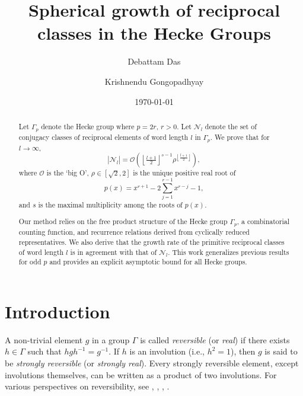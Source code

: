 \documentclass[11pt]{amsart}
\numberwithin{equation}{section}
\theoremstyle{definition}
\numberwithin{equation}{section}
\begin{document}
	\title[Spherical growth of reciprocal classes in the Hecke Groups]{ Spherical growth of reciprocal classes in the Hecke Groups }
	\author{Debattam Das  \and Krishnendu Gongopadhyay}
	\address{Indian Institute of Science Education and Research (IISER) Mohali,
		Knowledge City,  Sector 81, S.A.S. Nagar 140306, Punjab, India}
    	\address{Indian Institute of Science Education and Research (IISER) Mohali,
		Knowledge City,  Sector 81, S.A.S. Nagar 140306, Punjab, India}
	
	
	\begin{abstract}
		Let $\Gamma_p$ denote the Hecke group where $p=2r$, $r>0$. Let $\mathcal{N}_l$ denote the set of conjugacy classes of reciprocal elements of word length $l$ in $\Gamma_p$. We prove that for $l \to \infty$, 
		$$|\mathcal{N}_l| = \mathcal{O}\left(\left\lfloor \tfrac{l+1}{2} \right\rfloor^{s-1} \rho^{\left\lfloor \tfrac{l+1}{2} \right\rfloor} \right),
		$$
		where $\mathcal O$ is the `big O',  $\rho \in [\sqrt{2}, 2]$ is the unique positive real root of
		$$
		p(x) = x^{r+1} - 2\sum_{j=1}^{r-1} x^{r-j} - 1,
		$$
		and $s$ is the maximal multiplicity among the roots of $p(x)$. 
        
        Our method relies on the free product structure of the Hecke group $\Gamma_p$, a combinatorial counting function, and recurrence relations derived from cyclically reduced representatives. We also derive that the growth rate of the primitive reciprocal classes of word length $l$ is in agreement with that of $\mathcal{N}_l$. This work generalizes previous results for odd $p$ and provides an explicit asymptotic bound for all Hecke groups.
	\end{abstract}
	
	\date{\today}
	
	\maketitle	
	
	\section{Introduction}\label{1}

    A non-trivial element $g$ in a group $\Gamma$ is called \emph{reversible} (or \emph{real}) if there exists $h \in \Gamma$ such that $hgh^{-1} = g^{-1}$. If $h$ is an involution (i.e., $h^2 = 1$), then $g$ is said to be \emph{strongly reversible} (or \emph{strongly real}). Every strongly reversible element, except involutions themselves, can be written as a product of two involutions. For various perspectives on reversibility, see \cite{BR}, \cite{LR}, \cite{Sa}, \cite{OS}.
\end{document}
